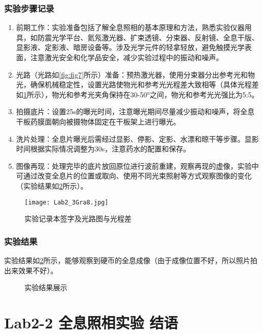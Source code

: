 \documentclass[dvipsnames, svgnames,a4paper,11pt]{article}
\begin{document}
	\subsubsection{实验步骤记录}
	\begin{enumerate}
		\item 前期工作：实验准备包括了解全息照相的基本原理和方法，熟悉实验仪器用具，如防震光学平台、氦氖激光器、扩束透镜、分束器、反射镜、全息干版、显影液、定影液、暗房设备等。涉及光学元件的轻拿轻放，避免触摸光学表面，注意激光安全和化学品安全，减少实验过程中的振动和噪声。
		\item 光路（光路如\cref{fig:fig7}所示）准备：预热激光器，使用分束器分出参考光和物光，确保机械稳定性，设置光路使物光和参考光光程差大致相等（具体光程差如\cref{fig:fig8}所示），物光和参考光夹角保持在30-50°之间，物光和参考光光强比为5:5。
		\item 拍摄底片：设置25s的曝光时间，注意曝光期间尽量减少振动和噪声，将全息干板药膜面朝向被摄物体固定在干板架上进行曝光。
		\item 洗片处理：全息片曝光后需经过显影、停影、定影、水漂和晾干等步骤。显影时间根据实际情况调整为30s，注意药水的配置和保存。
		\item 图像再现：处理完毕的底片放回原位进行波前重建，观察再现的虚像，实验中可通过改变全息片的位置或取向、使用不同光束照射等方式观察图像的变化（实验结果如\cref{fig:fig9}所示）。
	\end{enumerate}
	
	\begin{figure}[htbp]
		\centering
		\texttt{[image: Lab2\_3Gra8.jpg]}
		\caption{实验记录本签字及光路图与光程差}
		\label{fig:fig8}
	\end{figure}
	
	\subsubsection{实验结果}
	
	实验结果如\cref{fig:fig9}所示，能够观察到硬币的全息成像（由于成像位置不好，所以照片拍出来效果不好）。
	
	\begin{figure}[htbp]
		\centering
		\caption{实验结果展示}
		\label{fig:fig9}			
	\end{figure}
	
	\clearpage
	
	\section{Lab2-2 全息照相实验 \quad\heiti 结语}
	
\end{document}
